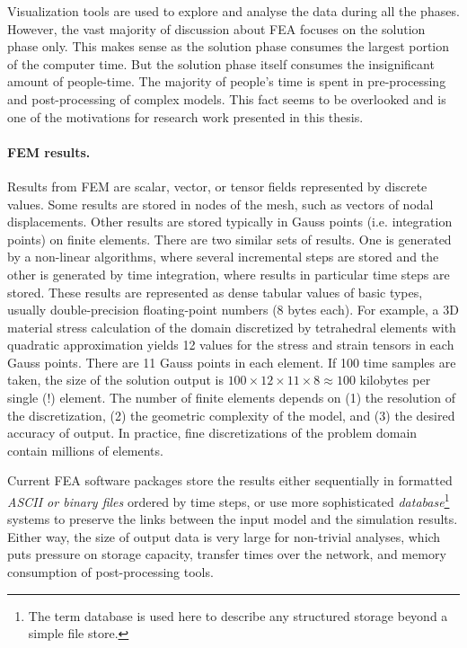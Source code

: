 Visualization tools are used to explore and analyse the data during all the phases. However, the vast majority of discussion about FEA focuses on the solution phase only. This makes sense as the solution phase consumes the largest portion of the computer time. But the solution phase itself consumes the insignificant amount of people-time. The majority of people's time is spent in pre-processing and post-processing of complex models. This fact seems to be overlooked and is one of the motivations for research work presented in this thesis.

\paragraph{FEM results.} Results from FEM are scalar, vector, or tensor fields represented by discrete values. Some results are stored in nodes of the mesh, such as vectors of nodal displacements. Other results are stored typically in Gauss points (i.e. integration points) on finite elements. There are two similar sets of results. One is generated by a non-linear algorithms, where several incremental steps are stored and the other is generated by time integration, where results in particular time steps are stored. These results are represented as dense tabular values of basic types, usually double-precision floating-point numbers (8 bytes each). For example, a 3D material stress calculation of the domain discretized by tetrahedral elements with quadratic approximation yields 12 values for the stress and strain tensors in each Gauss points. There are 11 Gauss points in each element. If 100 time samples are taken, the size of the solution output is $100 \times 12 \times 11 \times 8 \approx 100$ kilobytes per single (!) element. The number of finite elements depends on (1) the resolution of the discretization, (2) the geometric complexity of the model, and (3) the desired accuracy of output. In practice, fine discretizations of the problem domain contain millions of elements.

Current FEA software packages store the results either sequentially in formatted \textit{ASCII or binary files} ordered by time steps, or use more sophisticated \textit{database}\footnote{The term database is used here to describe any structured storage beyond a simple file store.} systems to preserve the links between the input model and the simulation results. Either way, the size of output data is very large for non-trivial analyses, which puts pressure on storage capacity, transfer times over the network, and memory consumption of post-processing tools.

